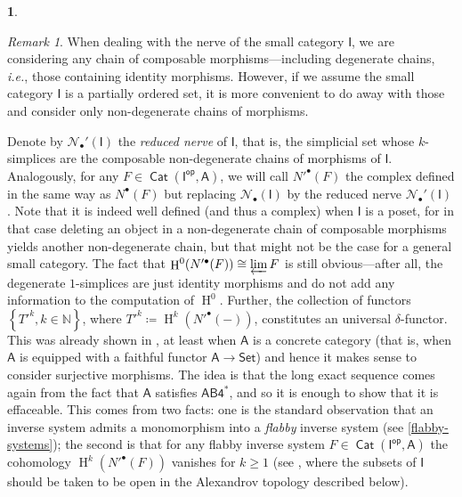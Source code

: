 \documentclass[reqno,11pt]{amsart}
\theoremstyle{plain}
\theoremstyle{remark}
\newtheorem*{rem}{Remark}
\theoremstyle{definition}
\newtheorem{cosa}[thm]{}
\numberwithin{equation}{thm}
\newcommand{\CN}{\mathcal{N}}
\newcommand{\SA}{\mathsf{A}}
\newcommand{\SI}{\mathsf{I}}
\newcommand{\NN}{\mathbb{N}}
\DeclareMathOperator{\h}{H}
\newcommand{\op}{\mathsf{op}}
\newcommand{\set}{\mathsf{Set}}
\DeclareMathOperator{\cat}{\mathsf{Cat}}
\begin{document}
\begin{cosa}
		\begin{rem}
			When dealing with the nerve of the small category $\SI$, we are considering any chain of composable morphisms---including degenerate chains, \emph{i.e.}, those containing identity morphisms. However, if we assume the small category $\SI$ is a partially ordered set, it is more convenient to do away with those and consider only non-degenerate chains of morphisms. 
			
			Denote by $\CN_\bullet'(\SI)$ the \emph{reduced nerve} of $\SI$, that is, the simplicial set whose $k$-simplices are the composable non-degenerate chains of morphisms of $\SI$. Analogously, for any $F \in \cat(\SI^\op, \SA)$, we will call $N'^\bullet(F)$ the complex defined in the same way as $N^\bullet(F)$ but replacing $\CN_\bullet(\SI)$ by the reduced nerve $\CN_\bullet'(\SI)$. Note that it is indeed well defined (and thus a complex) when $\SI$ is a poset, for in that case deleting an object in a non-degenerate chain of composable morphisms yields another non-degenerate chain, but that might not be the case for a general small category. The fact that $\h^0(N'^\bullet(F)) \cong \varprojlim F$ is still obvious---after all, the degenerate $1$-simplices are just identity morphisms and do not add any information to the computation of $\h^0$. Further, the collection of functors $\left\{T'^k, k \in \NN \right\}$, where $T'^k \coloneqq \h^k(N'^\bullet(-))$, constitutes an universal $\delta$-functor. This was already shown in \cite[Proposition 3]{roos-1958}, at least when $\SA$ is a concrete category (that is, when $\SA$ is equipped with a faithful functor $\SA \to \set$) and hence it makes sense to consider surjective morphisms. The idea is that the long exact sequence comes again from the fact that $\SA$ satisfies $\mathsf{AB4^*}$, and so it is enough to show that it is effaceable. This comes from two facts: one is the standard observation that an inverse system admits a monomorphism into a \textit{flabby} inverse system (see \ref{flabby-systems}); the second is that for any flabby inverse system $F \in \cat(\SI^\op, \SA)$ the cohomology $\h^k(N'^\bullet(F))$ vanishes for $k \geq 1$ (see \cite[Proposition 1]{roos-1958}, where the subsets of $\SI$ should be taken to be open in the Alexandrov topology described below). %
		\end{rem} 

	\end{cosa}
	
\end{document}
